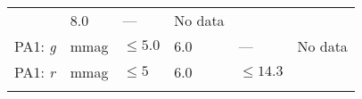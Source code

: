 \documentclass[DM,lsstdraft,toc]{lsstdoc}
\begin{document}
\begin{longtable}[]{@{}llllll@{}}
\begin{minipage}[t]{0.17\columnwidth}
\end{minipage} & \begin{minipage}[t]{0.17\columnwidth}\raggedright\strut
8.0\strut
\end{minipage} & \begin{minipage}[t]{0.12\columnwidth}\raggedright\strut
---\strut
\end{minipage} & \begin{minipage}[t]{0.17\columnwidth}\raggedright\strut
No data\strut
\end{minipage}\tabularnewline
\begin{minipage}[t]{0.14\columnwidth}\raggedright\strut
PA1: \emph{g}\strut
\end{minipage} & \begin{minipage}[t]{0.06\columnwidth}\raggedright\strut
mmag\strut
\end{minipage} & \begin{minipage}[t]{0.17\columnwidth}\raggedright\strut
\(\leq 5.0\)\strut
\end{minipage} & \begin{minipage}[t]{0.17\columnwidth}\raggedright\strut
6.0\strut
\end{minipage} & \begin{minipage}[t]{0.12\columnwidth}\raggedright\strut
---\strut
\end{minipage} & \begin{minipage}[t]{0.17\columnwidth}\raggedright\strut
No data\strut
\end{minipage}\tabularnewline
\begin{minipage}[t]{0.14\columnwidth}\raggedright\strut
PA1: \emph{r}\strut
\end{minipage} & \begin{minipage}[t]{0.06\columnwidth}\raggedright\strut
mmag\strut
\end{minipage} & \begin{minipage}[t]{0.17\columnwidth}\raggedright\strut
\(\leq 5\)\strut
\end{minipage} & \begin{minipage}[t]{0.17\columnwidth}\raggedright\strut
6.0\strut
\end{minipage} & \begin{minipage}[t]{0.12\columnwidth}\raggedright\strut
\(\leq 14.3\)\strut
\end{minipage} & \begin{minipage}[t]{0.17\columnwidth}\raggedright\strut
\strut
\end{minipage}\tabularnewline
\begin{minipage}[t]{0.14\columnwidth}\raggedright\strut

\end{minipage}
\end{longtable}
\end{document}

